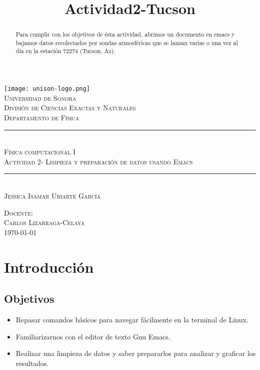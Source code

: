 \documentclass[12pt]{article}
\title{Actividad2-Tucson}
\newcommand{\HRule}{\rule{\linewidth}{0.5mm}}
\begin{document}
\begin{center}


\texttt{[image: unison-logo.png]}~\\[1cm]

\textsc{\LARGE Universidad de Sonora}\\[0.1cm]
\textsc{Divisi\'on de Ciencias Exactas y Naturales}\\[0.1cm]
\textsc{Departamento de F\'isica}\\[1.5cm]

\HRule \\[0.4cm]
\textsc{Física computacional I}\\[0.1cm]
\textsc{Actividad 2- Limpieza y preparación de datos usando Emacs}
\HRule \\[1.5cm]





\textsc{Jessica Isamar Uriarte García\\[1.0cm]}

\textsc{Docente:\\Carlos Lizarraga-Celaya\\[0.1cm]}
\vfill
\textsc{\today \\[0.1cm]}
\end{center}
\newpage
\section{Introducción}
\begin{abstract}
\noindent Para cumplir con los objetivos de ésta actividad, abrimos un documento en emacs y bajamos datos recolectados por sondas atmosféricas que se lanzan varias o una vez al día en la estación 72274 (Tucson, Az). 
\end{abstract}
\subsection{Objetivos}

\begin{itemize}
\item Repasar comandos básicos para navegar fácilmente en la terminal de Linux.
\item Familiarizarnos con el editor de texto Gnu Emacs.
\item Realizar una limpieza de datos y saber prepararlos para analizar y graficar los resultados. 
\end{itemize}
\end{document}
